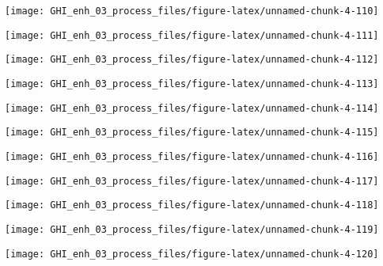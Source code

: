 \documentclass[
  10pt,
  a4paper,oneside]{article}
\begin{document}
\begin{center}\texttt{[image: GHI\_enh\_03\_process\_files/figure-latex/unnamed-chunk-4-110]} \end{center}

\begin{center}\texttt{[image: GHI\_enh\_03\_process\_files/figure-latex/unnamed-chunk-4-111]} \end{center}

\begin{center}\texttt{[image: GHI\_enh\_03\_process\_files/figure-latex/unnamed-chunk-4-112]} \end{center}

\begin{center}\texttt{[image: GHI\_enh\_03\_process\_files/figure-latex/unnamed-chunk-4-113]} \end{center}

\begin{center}\texttt{[image: GHI\_enh\_03\_process\_files/figure-latex/unnamed-chunk-4-114]} \end{center}

\begin{center}\texttt{[image: GHI\_enh\_03\_process\_files/figure-latex/unnamed-chunk-4-115]} \end{center}

\begin{center}\texttt{[image: GHI\_enh\_03\_process\_files/figure-latex/unnamed-chunk-4-116]} \end{center}

\begin{center}\texttt{[image: GHI\_enh\_03\_process\_files/figure-latex/unnamed-chunk-4-117]} \end{center}

\begin{center}\texttt{[image: GHI\_enh\_03\_process\_files/figure-latex/unnamed-chunk-4-118]} \end{center}

\begin{center}\texttt{[image: GHI\_enh\_03\_process\_files/figure-latex/unnamed-chunk-4-119]} \end{center}

\begin{center}\texttt{[image: GHI\_enh\_03\_process\_files/figure-latex/unnamed-chunk-4-120]} \end{center}
\end{document}
